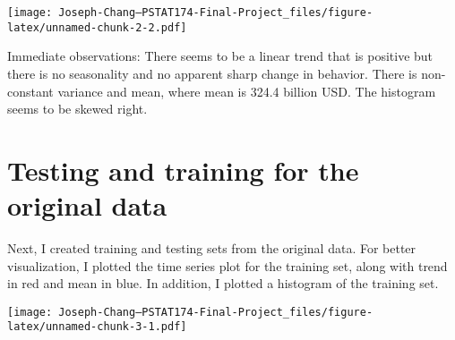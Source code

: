 \documentclass[
]{article}
\newenvironment{Shaded}{\begin{snugshade}}{\end{snugshade}}
\newcommand{\AttributeTok}[1]{\textcolor[rgb]{0.77,0.63,0.00}{#1}}
\newcommand{\CommentTok}[1]{\textcolor[rgb]{0.56,0.35,0.01}{\textit{#1}}}
\newcommand{\DecValTok}[1]{\textcolor[rgb]{0.00,0.00,0.81}{#1}}
\newcommand{\FunctionTok}[1]{\textcolor[rgb]{0.00,0.00,0.00}{#1}}
\newcommand{\NormalTok}[1]{#1}
\newcommand{\OtherTok}[1]{\textcolor[rgb]{0.56,0.35,0.01}{#1}}
\newcommand{\SpecialCharTok}[1]{\textcolor[rgb]{0.00,0.00,0.00}{#1}}
\newcommand{\StringTok}[1]{\textcolor[rgb]{0.31,0.60,0.02}{#1}}
\begin{document}
\texttt{[image: Joseph-Chang---PSTAT174-Final-Project\_files/figure-latex/unnamed-chunk-2-2.pdf]}

Immediate observations: There seems to be a linear trend that is
positive but there is no seasonality and no apparent sharp change in
behavior. There is non-constant variance and mean, where mean is 324.4
billion USD. The histogram seems to be skewed right.

\hypertarget{testing-and-training-for-the-original-data}{%
\section{Testing and training for the original
data}\label{testing-and-training-for-the-original-data}}

Next, I created training and testing sets from the original data. For
better visualization, I plotted the time series plot for the training
set, along with trend in red and mean in blue. In addition, I plotted a
histogram of the training set.

\begin{Shaded}
\end{Shaded}

\texttt{[image: Joseph-Chang---PSTAT174-Final-Project\_files/figure-latex/unnamed-chunk-3-1.pdf]}
\end{document}
